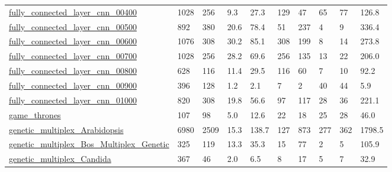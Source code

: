 \begin{longtable}{llllllllll}
 \href{https://github.com/gabrieleilertsen/nws}{fully\_connected\_layer\_cnn\_00400}                                            & 1028       & 256   & 9.3    & 27.3   & 129   & 47     & 65     & 77     & 126.8   \\
 \href{https://github.com/gabrieleilertsen/nws}{fully\_connected\_layer\_cnn\_00500}                                            & 892        & 380   & 20.6   & 78.4   & 51    & 237    & 4      & 9      & 336.4   \\
 \href{https://github.com/gabrieleilertsen/nws}{fully\_connected\_layer\_cnn\_00600}                                            & 1076       & 308   & 30.2   & 85.1   & 308   & 199    & 8      & 14     & 273.8   \\
 \href{https://github.com/gabrieleilertsen/nws}{fully\_connected\_layer\_cnn\_00700}                                            & 1028       & 256   & 28.2   & 69.6   & 256   & 135    & 13     & 22     & 206.0   \\
 \href{https://github.com/gabrieleilertsen/nws}{fully\_connected\_layer\_cnn\_00800}                                            & 628        & 116   & 11.4   & 29.5   & 116   & 60     & 7      & 10     & 92.2    \\
 \href{https://github.com/gabrieleilertsen/nws}{fully\_connected\_layer\_cnn\_00900}                                            & 396        & 128   & 1.2    & 2.1    & 7     & 2      & 40     & 44     & 5.9     \\
 \href{https://github.com/gabrieleilertsen/nws}{fully\_connected\_layer\_cnn\_01000}                                            & 820        & 308   & 19.8   & 56.6   & 97    & 117    & 28     & 36     & 221.1   \\
 \href{http://www.macalester.edu/~abeverid/data/stormofswords.csv}{game\_thrones}                                            & 107        & 98    & 5.0    & 12.6   & 22    & 18     & 25     & 28     & 46.0    \\
 \href{https://manliodedomenico.com/data.php}{genetic\_multiplex\_Arabidopsis}                                                & 6980       & 2509  & 15.3   & 138.7  & 127   & 873    & 277    & 362    & 1798.5  \\
 \href{https://manliodedomenico.com/data.php}{genetic\_multiplex\_Bos\_Multiplex\_Genetic}                                      & 325        & 119   & 13.3   & 35.3   & 15    & 77     & 2      & 5      & 105.9   \\
 \href{https://manliodedomenico.com/data.php}{genetic\_multiplex\_Candida}                                                    & 367        & 46    & 2.0    & 6.5    & 8     & 17     & 5      & 7      & 32.9    \\

\end{longtable}
